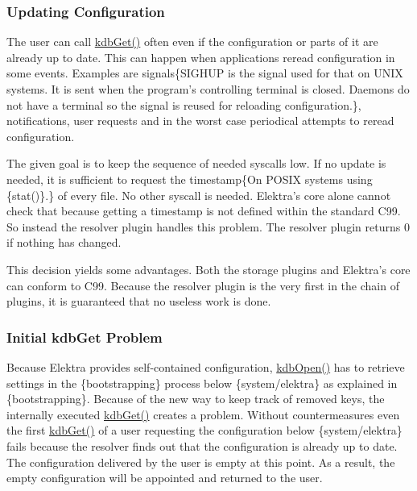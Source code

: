 \subsubsection*{Updating Configuration}

The user can call {\ttfamily \hyperlink{group__kdb_ga28e385fd9cb7ccfe0b2f1ed2f62453a1}{kdb\+Get()}} often even if the configuration or parts of it are already up to date. This can happen when applications reread configuration in some events. Examples are signals\{S\+I\+G\+H\+U\+P is the signal used for that on U\+N\+I\+X systems. It is sent when the program's controlling terminal is closed. Daemons do not have a terminal so the signal is reused for reloading configuration.\}, notifications, user requests and in the worst case periodical attempts to reread configuration.

The given goal is to keep the sequence of needed syscalls low. If no update is needed, it is sufficient to request the timestamp\{On P\+O\+S\+I\+X systems using \{stat()\}.\} of every file. No other syscall is needed. Elektra's core alone cannot check that because getting a timestamp is not defined within the standard C99. So instead the resolver plugin handles this problem. The resolver plugin returns 0 if nothing has changed.

This decision yields some advantages. Both the storage plugins and Elektra's core can conform to C99. Because the resolver plugin is the very first in the chain of plugins, it is guaranteed that no useless work is done.

\subsubsection*{Initial kdb\+Get Problem}

Because Elektra provides self-\/contained configuration, {\ttfamily \hyperlink{group__kdb_ga6808defe5870f328dd17910aacbdc6ca}{kdb\+Open()}} has to retrieve settings in the \{bootstrapping\} process below \{system/elektra\} as explained in \{bootstrapping\}. Because of the new way to keep track of removed keys, the internally executed {\ttfamily \hyperlink{group__kdb_ga28e385fd9cb7ccfe0b2f1ed2f62453a1}{kdb\+Get()}} creates a problem. Without countermeasures even the first {\ttfamily \hyperlink{group__kdb_ga28e385fd9cb7ccfe0b2f1ed2f62453a1}{kdb\+Get()}} of a user requesting the configuration below \{system/elektra\} fails because the resolver finds out that the configuration is already up to date. The configuration delivered by the user is empty at this point. As a result, the empty configuration will be appointed and returned to the user.

